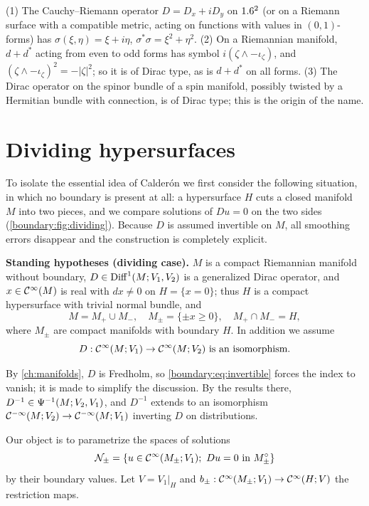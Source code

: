 \begin{example}\label{boundary:ex:dirac}
(1) The Cauchy--Riemann operator $D=D_x+iD_y$ on $1.6^2$ (or on a Riemann surface with
a compatible metric, acting on functions with values in $(0,1)$-forms) has
$\sigma(\xi,\eta)=\xi+i\eta$, $\sigma^*\sigma=\xi^2+\eta^2$.
(2) On a Riemannian manifold, $d+d^*$ acting from even to odd forms has symbol
$i(\zeta\wedge-\iota_\zeta)$, and $(\zeta\wedge-\iota_\zeta)^2=-|\zeta|^2$; so it is
of Dirac type, as is $d+d^*$ on all forms.
(3) The Dirac operator on the spinor bundle of a spin manifold, possibly twisted by a
Hermitian bundle with connection, is of Dirac type; this is the origin of the name.
\end{example}

\section{Dividing hypersurfaces}\label{boundary:sec:dividing}

To isolate the essential idea of Calder\'on we first consider the following
situation, in which no boundary is present at all: a hypersurface $H$ cuts a closed
manifold $M$ into two pieces, and we compare solutions of $Du=0$ on the two sides
(\cref{boundary:fig:dividing}). Because $D$ is assumed invertible on $M$, all
smoothing errors disappear and the construction is completely explicit.

\medskip\noindent\textbf{Standing hypotheses (dividing case).} $M$ is a compact
Riemannian manifold without boundary, $D\in\operatorname{Diff}^{1}(M;V_1,V_2)$ is a generalized
Dirac operator, and $x\in\mathcal{C}^\infty(M)$ is real with $dx\ne0$ on $H=\{x=0\}$; thus $H$ is a
compact hypersurface with trivial normal bundle, and
\begin{equation*}
M=M_+\cup M_-,\quad M_\pm=\{\pm x\ge0\},\quad M_+\cap M_-=H,
\end{equation*}
where $M_\pm$ are compact manifolds with boundary $H$. In addition we assume
\begin{equation}\label{boundary:eq:invertible}
D:\mathcal{C}^\infty(M;V_1)\to\mathcal{C}^\infty(M;V_2)\ \text{is an isomorphism.}
\end{equation}

By \cref{ch:manifolds}, $D$ is Fredholm, so \eqref{boundary:eq:invertible} forces the
index to vanish; it is made to simplify the discussion. By the results there,
$D^{-1}\in\Psi^{-1}(M;V_2,V_1)$, and $D^{-1}$ extends to an isomorphism
$\mathcal{C}^{-\infty}(M;V_2)\to\mathcal{C}^{-\infty}(M;V_1)$ inverting $D$ on distributions.

Our object is to parametrize the spaces of solutions
\begin{equation*}
\mathcal{N}_\pm=\{u\in\CI(M_\pm;V_1);\ Du=0\ \text{in}\ M_\pm^\circ\}
\end{equation*}
by their boundary values. Let $V=V_1|_H$ and $b_\pm:\mathcal{C}^\infty(M_\pm;V_1)\to\mathcal{C}^\infty(H;V)$ the
restriction maps.

